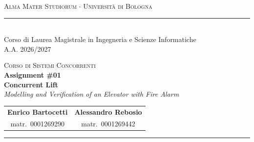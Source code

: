 \hypersetup{pageanchor=false}
\begin{titlepage}
  \begin{center}
    {{\Large{\textsc{Alma Mater Studiorum $\cdot$ Università di
    Bologna}}}}\\[1ex]
    \rule{15.8cm}{0.6mm}\\[2ex]
    {\small Corso di Laurea Magistrale in Ingegneria e Scienze Informatiche}\\
    {\small A.A. 2026/2027}
  \end{center}

  \vfill
  \begin{center}
    {\large\textsc{Corso di Sistemi Concorrenti}}\\[1.5ex]
    {\LARGE\textbf{Assignment \#01}}\\[2.5ex]
    {\Huge\textbf{Concurrent Lift}}\\[1.5ex]
    {\large\textit{Modelling and Verification of an Elevator with
    Fire Alarm}}\\[1ex]
  \end{center}
  \vfill

  \begin{center}
    \begin{tabular}{@{}c@{\qquad}c@{}}
      {\large\bf Enrico Bartocetti} & {\large\bf Alessandro Rebosio} \\[0.5ex]
      {\small matr.\ 0001269290 } & {\small matr.\ 0001269442}
    \end{tabular}
  \end{center}

  \vspace{2mm}
  \noindent\rule{\linewidth}{0.4pt}

\end{titlepage}
\hypersetup{pageanchor=true}